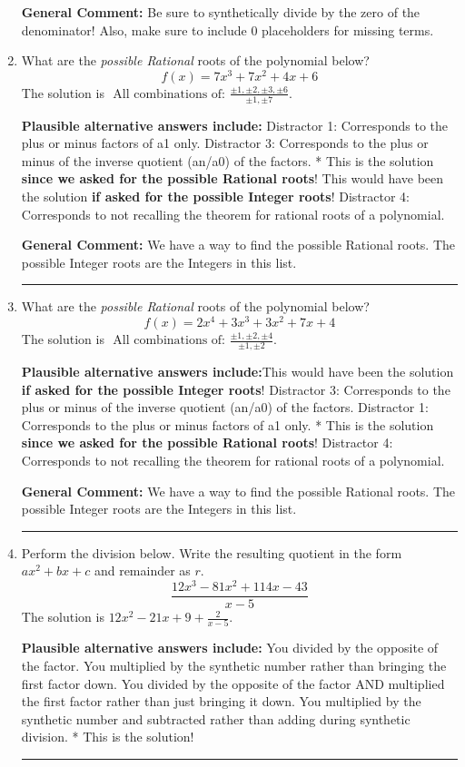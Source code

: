\documentclass{extbook}[14pt]
\newcommand{\litem}[1]{\item #1

\rule{\textwidth}{0.4pt}}
\begin{document}
\begin{enumerate}
{\textbf{General Comment:} Be sure to synthetically divide by the zero of the denominator! Also, make sure to include 0 placeholders for missing terms.
}
\litem{
What are the \textit{possible Rational} roots of the polynomial below?
\[ f(x) = 7x^{3} +7 x^{2} +4 x + 6 \]The solution is \( \text{ All combinations of: }\frac{\pm 1,\pm 2,\pm 3,\pm 6}{\pm 1,\pm 7} \).\begin{enumerate}[label=\Alph*.]
\textbf{Plausible alternative answers include:} Distractor 1: Corresponds to the plus or minus factors of a1 only.
 Distractor 3: Corresponds to the plus or minus of the inverse quotient (an/a0) of the factors. 
* This is the solution \textbf{since we asked for the possible Rational roots}!
This would have been the solution \textbf{if asked for the possible Integer roots}!
 Distractor 4: Corresponds to not recalling the theorem for rational roots of a polynomial.
\end{enumerate}

\textbf{General Comment:} We have a way to find the possible Rational roots. The possible Integer roots are the Integers in this list.
}
\litem{
What are the \textit{possible Rational} roots of the polynomial below?
\[ f(x) = 2x^{4} +3 x^{3} +3 x^{2} +7 x + 4 \]The solution is \( \text{ All combinations of: }\frac{\pm 1,\pm 2,\pm 4}{\pm 1,\pm 2} \).\begin{enumerate}[label=\Alph*.]
\textbf{Plausible alternative answers include:}This would have been the solution \textbf{if asked for the possible Integer roots}!
 Distractor 3: Corresponds to the plus or minus of the inverse quotient (an/a0) of the factors. 
 Distractor 1: Corresponds to the plus or minus factors of a1 only.
* This is the solution \textbf{since we asked for the possible Rational roots}!
 Distractor 4: Corresponds to not recalling the theorem for rational roots of a polynomial.
\end{enumerate}

\textbf{General Comment:} We have a way to find the possible Rational roots. The possible Integer roots are the Integers in this list.
}
\litem{
Perform the division below. Write the resulting quotient in the form $ax^2+bx+c$ and remainder as $r$.
\[ \frac{12x^{3} -81 x^{2} +114 x -43}{x -5} \]The solution is \( 12x^{2} -21 x + 9 + \frac{2}{x -5} \).\begin{enumerate}[label=\Alph*.]
\textbf{Plausible alternative answers include:} You divided by the opposite of the factor.
 You multiplied by the synthetic number rather than bringing the first factor down.
 You divided by the opposite of the factor AND multiplied the first factor rather than just bringing it down.
 You multiplied by the synthetic number and subtracted rather than adding during synthetic division.
* This is the solution!
\end{enumerate}

}
\end{enumerate}
\end{document}
